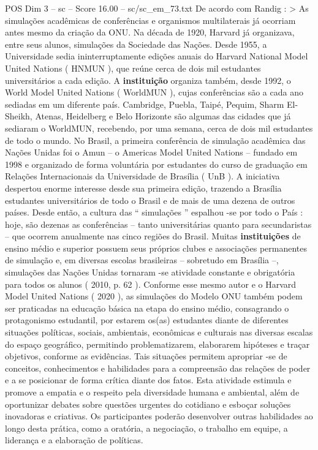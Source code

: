 \begin{textsample}{POS Dim 3 – sc – Score 16.00 – sc/sc\_em\_73.txt}
De acordo com Randig : > As simulações acadêmicas de conferências e organismos multilaterais já ocorriam antes mesmo da criação da ONU.
Na década de 1920, Harvard já organizava, entre seus alunos, simulações da Sociedade das Nações.
Desde 1955, a Universidade sedia ininterruptamente edições anuais do Harvard National Model United Nations ( HNMUN ), que reúne cerca de dois mil estudantes universitários a cada edição.
A \textbf{instituição} organiza também, desde 1992, o World Model United Nations ( WorldMUN ), cujas conferências são a cada ano sediadas em um diferente país.
Cambridge, Puebla, Taipé, Pequim, Sharm El-Sheikh, Atenas, Heidelberg e Belo Horizonte são algumas das cidades que já sediaram o WorldMUN, recebendo, por uma semana, cerca de dois mil estudantes de todo o mundo.
No Brasil, a primeira conferência de simulação acadêmica das Nações Unidas foi o Amun – o Americas Model United Nations – fundado em 1998 e organizado de forma voluntária por estudantes do curso de graduação em Relações Internacionais da Universidade de Brasília ( UnB ).
A iniciativa despertou enorme interesse desde sua primeira edição, trazendo a Brasília estudantes universitários de todo o Brasil e de mais de uma dezena de outros países.
Desde então, a cultura das “ simulações ” espalhou -se por todo o País : hoje, são dezenas as conferências – tanto universitárias quanto para secundaristas – que ocorrem anualmente nas cinco regiões do Brasil.
Muitas \textbf{instituições} de ensino médio e superior possuem seus próprios clubes e associações permanentes de simulação e, em diversas escolas brasileiras – sobretudo em Brasília –, simulações das Nações Unidas tornaram -se atividade constante e obrigatória para todos os alunos ( 2010, p. 62 ).
Conforme esse mesmo autor e o Harvard Model United Nations ( 2020 ), as simulações do Modelo ONU também podem ser praticadas na educação básica na etapa do ensino médio, consagrando o protagonismo estudantil, por estarem os(as) estudantes diante de diferentes situações políticas, sociais, ambientais, econômicas e culturais nas diversas escalas do espaço geográfico, permitindo problematizarem, elaborarem hipóteses e traçar objetivos, conforme as evidências.
Tais situações permitem apropriar -se de conceitos, conhecimentos e habilidades para a compreensão das relações de poder e a se posicionar de forma crítica diante dos fatos.
Esta atividade estimula e promove a empatia e o respeito pela diversidade humana e ambiental, além de oportunizar debates sobre questões urgentes do cotidiano e esboçar soluções inovadoras e criativas.
Os participantes poderão desenvolver outras habilidades ao longo desta prática, como a oratória, a negociação, o trabalho em equipe, a liderança e a elaboração de políticas.

\end{textsample}
